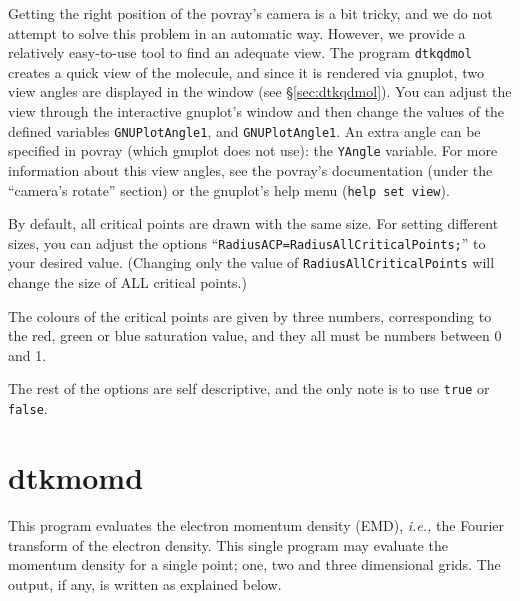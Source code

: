 Getting the right position of the povray's camera is a bit tricky, and we do not attempt to solve this problem in an automatic way. However, we provide a relatively easy-to-use tool to find an adequate view. The program \texttt{dtkqdmol} creates a quick view of the molecule, and since it is rendered via gnuplot, two view angles are displayed in the window (see \S\ref{sec:dtkqdmol}). You can adjust the view through the interactive gnuplot's window and then change the values of the defined variables \texttt{GNUPlotAngle1}, and \texttt{GNUPlotAngle1}. An extra angle can be specified in povray (which gnuplot does not use): the \texttt{YAngle} variable. For more information about this view angles, see the povray's documentation (under the ``camera's rotate'' section) or the gnuplot's help menu (\texttt{help set view}).

By default, all critical points are drawn with the same size. For setting different sizes, you can adjust the options ``\texttt{RadiusACP=RadiusAllCriticalPoints;}'' to your desired value. (Changing only the value of \texttt{RadiusAllCriticalPoints} will change the size of ALL critical points.)

The colours of the critical points are given by three numbers, corresponding to the red, green or blue saturation value, and they all must be numbers between 0 and 1.

The rest of the options are self descriptive, and the only note is to use \texttt{true} or \texttt{false}.

\section{dtkmomd}

This program evaluates the electron momentum density (EMD), \textit{i.e.,} the Fourier transform of the electron density. This single program may evaluate the momentum density for a single point; one, two and three dimensional grids. The output, if any, is written as explained below.

